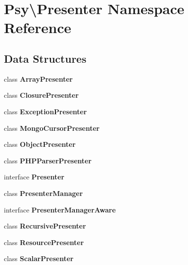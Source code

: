 \section{Psy\textbackslash{}Presenter Namespace Reference}
\label{namespace_psy_1_1_presenter}
\subsection*{Data Structures}
\begin{DoxyCompactItemize}
\item 
class {\bf Array\+Presenter}
\item 
class {\bf Closure\+Presenter}
\item 
class {\bf Exception\+Presenter}
\item 
class {\bf Mongo\+Cursor\+Presenter}
\item 
class {\bf Object\+Presenter}
\item 
class {\bf P\+H\+P\+Parser\+Presenter}
\item 
interface {\bf Presenter}
\item 
class {\bf Presenter\+Manager}
\item 
interface {\bf Presenter\+Manager\+Aware}
\item 
class {\bf Recursive\+Presenter}
\item 
class {\bf Resource\+Presenter}
\item 
class {\bf Scalar\+Presenter}
\end{DoxyCompactItemize}
